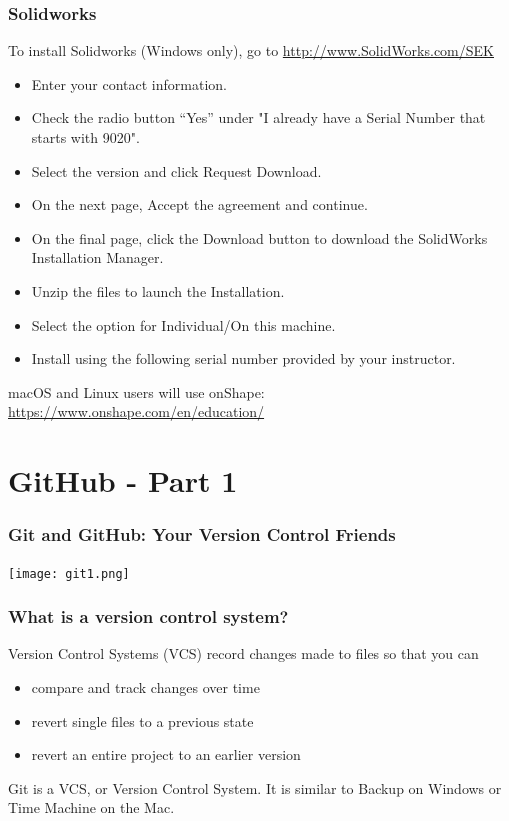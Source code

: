 \documentclass{beamer}
\begin{document}
\begin{frame}\frametitle{Solidworks}


To install Solidworks (Windows only), go to \url{http://www.SolidWorks.com/SEK}
\begin{itemize}
\item Enter your contact information.
\item Check the radio button “Yes” under "I already have a Serial Number that starts with 9020".
\item Select the version and click Request Download.
\item On the next page, Accept the agreement and continue.
\item On the final page, click the Download button to download the SolidWorks Installation Manager.
\item Unzip the files to launch the Installation.
\item Select the option for Individual/On this machine.
\item Install using the following serial number provided by your instructor.
\end{itemize}
macOS and Linux users will use onShape: \url{https://www.onshape.com/en/education/}
\end{frame}

\section{GitHub - Part 1}
\label{githubsection1}
\begin{frame}\frametitle{Git and GitHub: Your Version Control Friends}
\begin{center}
\texttt{[image: git1.png]}
\end{center}
\end{frame}

\begin{frame}\frametitle{What is a version control system?}
Version Control Systems (VCS) record changes made to files so that you can
\vspace{1cm}
\begin{itemize}
\item compare and track changes over time
\item revert single files to a previous state
\item revert an entire project to an earlier version
\end{itemize}
\vspace{1cm}
Git is a VCS, or Version Control System.\newline
It is similar to Backup on Windows or Time Machine on the Mac.
\end{frame}
\end{document}
